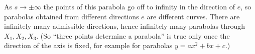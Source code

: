 As $s\to\pm\infty$ the points of this parabola go off to infinity in the direction of $e$, so parabolas obtained from different directions $e$ are different curves. There are infinitely many admissible directions, hence infinitely many parabolas through $X_1,X_2,X_3$. (So ``three points determine a parabola'' is true only once the direction of the axis is fixed, for example for parabolas $y=ax^2+bx+c$.)

